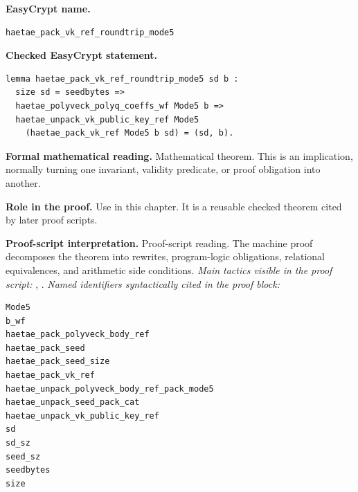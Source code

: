\begin{formaltheorem}
\noindent\textbf{EasyCrypt name.}
\begin{lstlisting}[language=EasyCrypt,basicstyle=\ttfamily\scriptsize]
haetae_pack_vk_ref_roundtrip_mode5
\end{lstlisting}
\noindent\textbf{Checked EasyCrypt statement.}
\begin{lstlisting}[language=EasyCrypt,basicstyle=\ttfamily\scriptsize]
lemma haetae_pack_vk_ref_roundtrip_mode5 sd b :
  size sd = seedbytes =>
  haetae_polyveck_polyq_coeffs_wf Mode5 b =>
  haetae_unpack_vk_public_key_ref Mode5
    (haetae_pack_vk_ref Mode5 b sd) = (sd, b).
\end{lstlisting}
\noindent\textbf{Formal mathematical reading.}
Mathematical theorem. This is an implication, normally turning one invariant, validity predicate, or proof obligation into another.

\noindent\textbf{Role in the proof.}
Use in this chapter. It is a reusable checked theorem cited by later proof scripts.

\noindent\textbf{Proof-script interpretation.}
Proof-script reading. The machine proof decomposes the theorem into rewrites, program-logic obligations, relational equivalences, and arithmetic side conditions.
\emph{Main tactics visible in the proof script:} , .
\emph{Named identifiers syntactically cited in the proof block:}
\begin{lstlisting}[language=EasyCrypt,basicstyle=\ttfamily\scriptsize]
Mode5
b_wf
haetae_pack_polyveck_body_ref
haetae_pack_seed
haetae_pack_seed_size
haetae_pack_vk_ref
haetae_unpack_polyveck_body_ref_pack_mode5
haetae_unpack_seed_pack_cat
haetae_unpack_vk_public_key_ref
sd
sd_sz
seed_sz
seedbytes
size
\end{lstlisting}

\end{formaltheorem}

